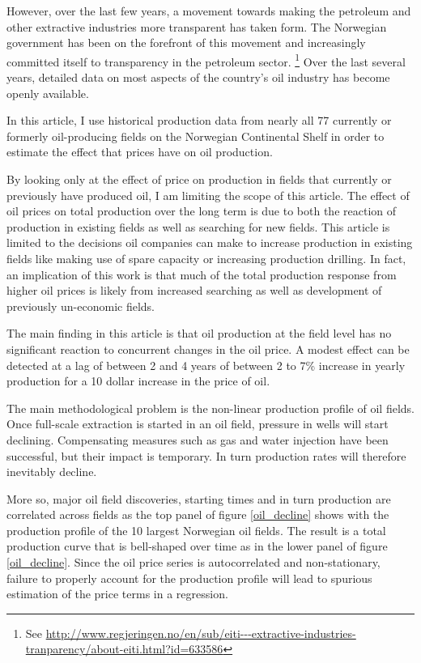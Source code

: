 \documentclass[12pt]{article}
\begin{document}
However, over the last few years, a movement towards making the petroleum and other extractive industries more transparent has taken form.  The Norwegian government has been on the forefront of this movement and increasingly committed itself to transparency in the petroleum sector. \footnote{See \url{http://www.regjeringen.no/en/sub/eiti---extractive-industries-tranparency/about-eiti.html?id=633586}} Over the last several years, detailed data on most aspects of the country's oil industry has become openly available.  

In this article, I use historical production data from nearly all 77 currently or formerly oil-producing fields on the Norwegian Continental Shelf in order to estimate the effect that prices have on oil production.

By looking only at the effect of price on production in fields that currently or previously have produced oil, I am limiting the scope of this article.  The effect of oil prices on total production over the long term is due to both the reaction of production in existing fields as well as searching for new fields. This article is limited to the decisions oil companies can make to increase production in existing fields like making use of spare capacity or increasing production drilling. In fact, an implication of this work is that much of the total production response from higher oil prices is likely from increased searching as well as development of previously un-economic fields.

The main finding in this article is that oil production at the field level has no significant reaction to concurrent changes in the oil price.  A modest effect can be detected at a lag of between 2 and 4 years of between 2 to 7\% increase in yearly production for a 10 dollar increase in the price of oil.


The main methodological problem is the non-linear production profile of oil fields.  Once full-scale extraction is started in an oil field, pressure in wells will start declining. Compensating measures such as gas and water injection have been successful, but their impact is temporary. In turn production rates will therefore inevitably decline.

More so, major oil field discoveries, starting times and in turn production are correlated across fields as the top panel of figure \ref{oil_decline} shows with the production profile of the 10 largest Norwegian oil fields.  The result is a total production curve that is bell-shaped over time as in the lower panel of figure \ref{oil_decline}.  Since the oil price series is autocorrelated and non-stationary, failure to properly account for the production profile will lead to spurious estimation of the price terms in a regression.
\end{document}
